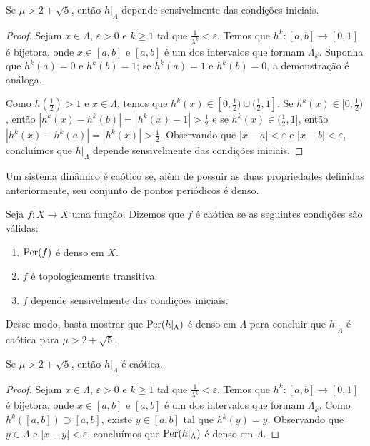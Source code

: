 \begin{proposition}
Se $\mu > 2 + \sqrt{5}$, então $h|_\Lambda$ depende sensivelmente das condições iniciais.
\end{proposition}

\begin{proof}
Sejam $x \in \Lambda$, $\varepsilon > 0$ e $k \geq 1$ tal que $\frac{1}{\lambda^k} < \varepsilon$.
Temos que $h^k: [a, b] \to [0, 1]$ é bijetora, onde $x \in [a, b]$ e $[a, b]$ é um dos intervalos que formam $\Lambda_k$. Suponha que $h^k(a) = 0$ e $h^k(b) = 1$; se $h^k(a) = 1$ e $h^k(b) = 0$, a demonstração é análoga.

Como $h(\frac{1}{2}) > 1$ e $x \in \Lambda$, temos que $h^{k}(x) \in [0, \frac{1}{2}) \cup (\frac{1}{2}, 1]$. Se $h^{k}(x) \in [0, \frac{1}{2})$, então $|h^k(x) - h^k(b)| = |h^k(x) - 1| > \frac{1}{2}$ e se $h^{k}(x) \in (\frac{1}{2}, 1]$, então $|h^k(x) - h^k(a)| = |h^k(x)| > \frac{1}{2}$. Observando que $|x - a| < \varepsilon$ e  $|x - b| < \varepsilon$, concluímos que $h|_\Lambda$ depende sensivelmente das condições iniciais.
\end{proof}

Um sistema dinâmico é caótico se, além de possuir as duas propriedades definidas anteriormente, seu conjunto de pontos periódicos é denso.

\begin{definition}
Seja $f: X \to X$ uma função. Dizemos que $f$ é caótica se as seguintes condições são válidas:
\begin{enumerate}[label=\roman*.]
\item $\operatorname{Per}(f)$ é denso em $X$.
\item $f$ é topologicamente transitiva.
\item $f$ depende sensivelmente das condições iniciais.
\end{enumerate}
\end{definition}

Desse modo, basta mostrar que $\operatorname{Per}(h|_\Lambda)$ é denso em $\Lambda$ para concluir que $h|_\Lambda$ é caótica para $\mu > 2 + \sqrt{5}$.

\begin{theorem}\label{teo 4-0}
Se $\mu > 2 + \sqrt{5}$, então $h|_\Lambda$ é caótica.
\end{theorem}

\begin{proof}
Sejam $x \in \Lambda$, $\varepsilon > 0$ e $k \geq 1$ tal que $\frac{1}{\lambda^k} < \varepsilon$.
Temos que $h^k: [a, b] \to [0, 1]$ é bijetora, onde $x \in [a, b]$ e $[a, b]$ é um dos intervalos que formam $\Lambda_k$.
Como $h^k([a, b]) \supset [a, b]$, existe $y \in [a, b]$ tal que $h^k(y) = y$. Observando que $y \in \Lambda$ e $|x - y| < \varepsilon$, concluímos que $\operatorname{Per}(h|_\Lambda)$ é denso em $\Lambda$.
\end{proof}

